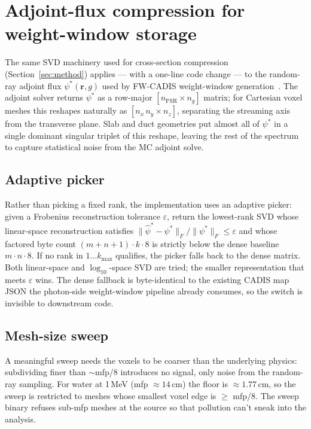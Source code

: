 \section{Adjoint-flux compression for weight-window storage}
\label{sec:adjoint-compression}

The same SVD machinery used for cross-section compression
(Section~\ref{sec:method}) applies — with a one-line code change — to
the random-ray adjoint flux $\psi^{*}(\mathbf{r}, g)$ used by FW-CADIS
weight-window generation~\citep{evans2020adjoint}. The adjoint
solver returns $\psi^{*}$ as a row-major
$[n_{\text{FSR}} \times n_{g}]$ matrix; for Cartesian voxel meshes
this reshapes naturally as
$[n_{x}\,n_{y} \times n_{z}]$, separating the streaming axis from the
transverse plane. Slab and duct geometries put almost all of
$\psi^{*}$ in a single dominant singular triplet of this reshape,
leaving the rest of the spectrum to capture statistical noise from
the MC adjoint solve.

\subsection{Adaptive picker}

Rather than picking a fixed rank, the implementation uses an
adaptive picker: given a Frobenius reconstruction tolerance
$\varepsilon$, return the lowest-rank SVD whose linear-space
reconstruction satisfies $\|\hat\psi^{*} - \psi^{*}\|_{F} /
\|\psi^{*}\|_{F} \le \varepsilon$ and whose factored byte count
$(m + n + 1) \cdot k \cdot 8$ is strictly below the dense baseline
$m \cdot n \cdot 8$. If no rank in $1 \ldots k_{\max}$ qualifies,
the picker falls back to the dense matrix. Both linear-space and
$\log_{10}$-space SVD are tried; the smaller representation that
meets $\varepsilon$ wins. The dense fallback is byte-identical to
the existing CADIS map JSON the photon-side weight-window pipeline
already consumes, so the switch is invisible to downstream code.

\subsection{Mesh-size sweep}

A meaningful sweep needs the voxels to be coarser than the
underlying physics: subdividing finer than $\sim$mfp/8 introduces
no signal, only noise from the random-ray sampling. For water at
1\,MeV (mfp $\approx 14$\,cm) the floor is $\approx 1.77$\,cm,
so the sweep is restricted to meshes whose smallest voxel edge is
$\ge$ mfp/8. The sweep binary refuses sub-mfp meshes at the
source so that pollution can't sneak into the analysis.

